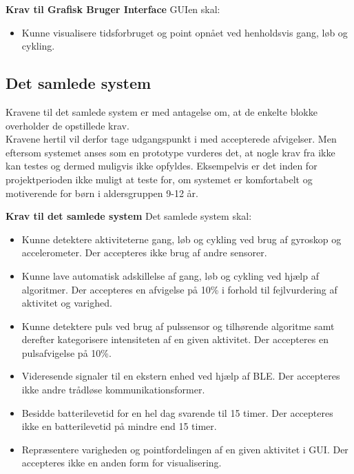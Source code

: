 \textbf{Krav til Grafisk Bruger Interface} \newline 
GUIen skal:
\begin{itemize}
	\item Kunne visualisere tidsforbruget og point opnået ved henholdsvis gang, løb og cykling. 
\end{itemize}

\subsection{Det samlede system} \label{krav_samlet_sys}
Kravene til det samlede system er med antagelse om, at de enkelte blokke overholder de opstillede krav.\\
Kravene hertil vil derfor tage udgangspunkt i  med accepterede afvigelser. Men eftersom systemet anses som en prototype vurderes det, at nogle krav fra  ikke kan testes og dermed muligvis ikke opfyldes. %
Eksempelvis er det inden for projektperioden ikke muligt at teste for, om systemet er komfortabelt og motiverende for børn i aldersgruppen 9-12 år.

\textbf{Krav til det samlede system} \newline
Det samlede system skal:
\begin{itemize}
	\item Kunne detektere aktiviteterne gang, løb og cykling ved brug af gyroskop og accelerometer. Der accepteres ikke brug af andre sensorer.
	\item Kunne lave automatisk adskillelse af gang, løb og cykling ved hjælp af algoritmer. Der accepteres en afvigelse på 10\% i forhold til fejlvurdering af aktivitet og varighed.
	\item Kunne detektere puls ved brug af pulssensor og tilhørende algoritme samt derefter kategorisere intensiteten af en given aktivitet. Der accepteres en pulsafvigelse på 10\%.
	\item Videresende signaler til en ekstern enhed ved hjælp af BLE. Der accepteres ikke andre trådløse kommunikationsformer.
	\item Besidde batterilevetid for en hel dag svarende til 15 timer. Der accepteres ikke en batterilevetid på mindre end 15 timer.
	\item Repræsentere varigheden og pointfordelingen af en given aktivitet i GUI. Der accepteres ikke en anden form for visualisering. 
\end{itemize}

